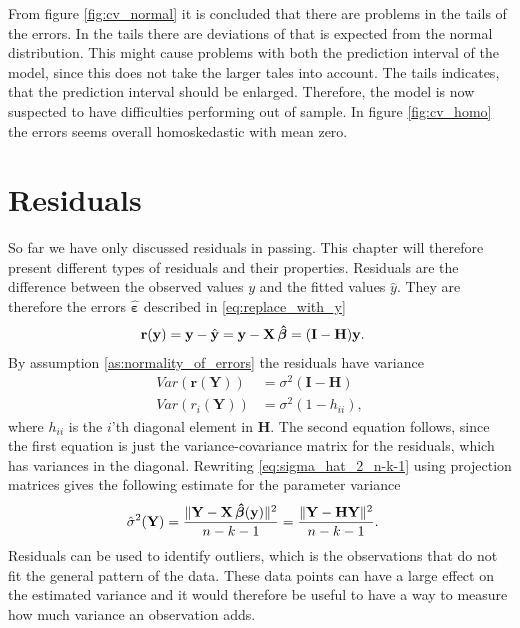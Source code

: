 From figure \ref{fig:cv_normal} it is concluded that there are problems in the tails of the errors. 
In the tails there are deviations of that is expected from the normal distribution. 
This might cause problems with both the prediction interval of the model, since this does not take the larger tales into account.
The tails indicates, that the prediction interval should be enlarged.
Therefore, the model is now suspected to have difficulties performing out of sample. 
In figure \ref{fig:cv_homo} the errors seems overall homoskedastic with mean zero. 

\section{Residuals}\label{subsec:residuals}
So far we have only discussed residuals in passing. 
This chapter will therefore present different types of residuals and their properties.
Residuals are the difference between the observed values $y$ and the fitted values $\hat{y}$. They are therefore the errors $\boldsymbol{\hat{\varepsilon}}$ described in \eqref{eq:replace_with_y}
\begin{align*}
    \textbf{r}(\textbf{y}) &= \textbf{y} - \hat{\textbf{y}} = \textbf{y} - \textbf{X} \operatorname{\boldsymbol{\hat{\beta}}} = (\textbf{I} - \textbf{H}) \textbf{y}.
\end{align*}
By assumption \ref{as:normality_of_errors} the residuals have variance
\begin{align*}
    Var(\textbf{r}(\textbf{Y})) &= \sigma^2 (\textbf{I} - \textbf{H}) \\
    Var(r_i(\textbf{Y})) &= \sigma^2(1 - h_{ii}),
\end{align*}
where $h_{ii}$ is the $i$'th diagonal element in $\textbf{H}$. The second equation follows, since the first equation is just the variance-covariance matrix for the residuals, which has variances in the diagonal.
Rewriting \eqref{eq:sigma_hat_2_n-k-1} using projection matrices gives the following estimate for the parameter variance
\begin{align*}
    \hat{\sigma}^2(\textbf{Y}) &= \frac{\| \textbf{Y} - \textbf{X} \operatorname{\boldsymbol{\hat{\beta}}} (\textbf{y}) \|^2 }{n-k-1} = \frac{\| \textbf{Y} - \textbf{H} \textbf{Y} \|^2}{n-k-1} .
\end{align*}
Residuals can be used to identify outliers, which is the observations that do not fit the general pattern of the data.
These data points can have a large effect on the estimated variance and it would therefore be useful to have a way to measure how much variance an observation adds.
